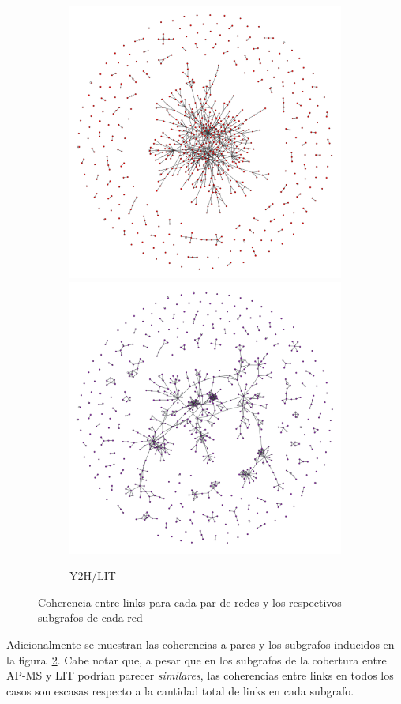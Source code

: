\begin{figure}[!ht]
\begin{subfigure}[b]{0.3\columnwidth}
        \includegraphics[width=.45\textwidth]{./schemes/subgrafo_Y2H_y2h_lit-gml.pdf}
        \includegraphics[width=.45\textwidth]{./schemes/subgrafo_LIT_y2h_lit-gml.pdf}
        \caption{\label{fig:y2h-lit} Y2H/LIT}
    \end{subfigure}
    \caption{\label{fig:subgrafos} Coherencia entre links para cada par de redes y los respectivos subgrafos de cada red }
\end{figure}

Adicionalmente se muestran las coherencias
a pares y los subgrafos inducidos en la figura~\ref{fig:subgrafos}. Cabe notar que, a pesar que en los subgrafos
de la cobertura entre AP-MS y LIT podr\'ian parecer \textit{similares}, las coherencias entre links en todos los casos son
escasas respecto a la cantidad total de links en cada subgrafo.
